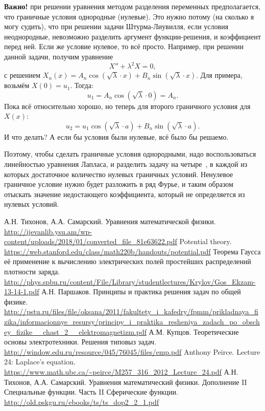 \documentclass[12pt]{report}
\begin{document}
\textbf{Важно!} при решении уравнения методом разделения переменных предполагается, что граничные условия однородные (нулевые). Это нужно потому (на сколько я могу судить), что при решении задачи Штурма-Лиувилля, если условия неоднородные, невозможно разделить аргумент функции-решения, и коэффициент перед ней. Если же условие нулевое, то всё просто. Например, при решении данной задачи, получим уравнение
\[
X'' + \lambda^2 X = 0,
\]
с решением $X_n(x) = A_n \cos(\sqrt{\lambda}\cdot x) + B_n \sin(\sqrt{\lambda}\cdot x)$.
Для примера, возьмём $X(0) = u_1$. Тогда:
\[
u_1 = A_n\cos(\sqrt{\lambda}\cdot 0) = A_n.
\]
Пока всё относительно хорошо, но теперь для второго граничного условия для $X(x)$:
\[
	u_2 = u_1\cos(\sqrt{\lambda}\cdot a) + B_n\sin(\sqrt{\lambda}\cdot a).
\]
И что делать? А если бы условия были нулевые, всё было бы решаемо.

Поэтому, чтобы сделать граничные условия однородными, надо воспользоваться линейностью уравнения Лапласа, и разделить задачу на четыре~\cite{Laplace-eq-rectangle}, в каждой из которых достаточное количество нулевых граничных условий. Ненулевое граничное условие нужно будет разложить в ряд Фурье, и таким образом отыскать значение недостающего коэффициента, который не определяется из нулевых условий.


\begin{thebibliography}{0}
	А.Н. Тихонов, А.А. Самарский.
	Уравнения математической физики.
	\url{http://ijevanlib.ysu.am/wp-content/uploads/2018/01/converted_file_81e63622.pdf}
	Potential theory.
	\url{https://web.stanford.edu/class/math220b/handouts/potential.pdf}
	Теорема Гаусса  её применение к вычислению электрических полей простейших распределений плотности заряда.
	\url{http://phys.spbu.ru/content/File/Library/studentlectures/Krylov/Gos_Ekzam-13-14-1.pdf}
	А.Н. Паршаков. Принципы и практика решения задач по общей физике.
	\url{http://pstu.ru/files/file/oksana/2011/fakultety_i_kafedry/fpmm/prikladnaya_fizika/informacionnye_resursy/principy_i_praktika_resheniya_zadach_po_obschey_fizike__chast_2__elektromagnetizm.pdf}
	А.М. Купцов. Теоретические основы электротехники. Решения типовыз задач.
	\url{http://window.edu.ru/resource/045/76045/files/emp.pdf}
	Anthony Peirce. Lecture 24: Laplace's equation.
	\url{https://www.math.ubc.ca/~peirce/M257_316_2012_Lecture_24.pdf}
	А.Н. Тихонов, А.А. Самарский.
	Уравнения математический физики. 
	Дополнение  II Специальные функции. 
	Часть II Сферические функции.
	\url{http://old.pskgu.ru/ebooks/ts/ts_dop2_2_1.pdf}
\end{thebibliography}
\end{document}
